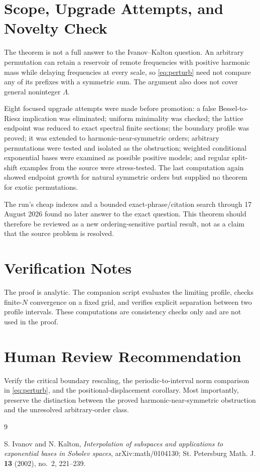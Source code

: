 \documentclass[11pt]{article}
\begin{document}
\section*{Scope, Upgrade Attempts, and Novelty Check}

The theorem is not a full answer to the Ivanov--Kalton question.  An arbitrary
permutation can retain a reservoir of remote frequencies with positive
harmonic mass while delaying frequencies at every scale, so
\eqref{eq:perturb} need not compare any of its prefixes with a symmetric sum.
The argument also does not cover general noninteger $\Lambda$.

Eight focused upgrade attempts were made before promotion: a false
Bessel-to-Riesz implication was eliminated; uniform minimality was checked;
the lattice endpoint was reduced to exact spectral finite sections; the
boundary profile was proved; it was extended to harmonic-near-symmetric
orders; arbitrary permutations were tested and isolated as the obstruction;
weighted conditional exponential bases were examined as possible positive
models; and regular split-shift examples from the source were stress-tested.
The last computation again showed endpoint growth for natural symmetric
orders but supplied no theorem for exotic permutations.

The run's cheap indexes and a bounded exact-phrase/citation search through
17 August 2026 found no later answer to the exact question.  This theorem
should therefore be reviewed as a new ordering-sensitive partial result, not
as a claim that the source problem is resolved.

\section*{Verification Notes}

The proof is analytic.  The companion script evaluates the limiting profile,
checks finite-$N$ convergence on a fixed grid, and verifies explicit
separation between two profile intervals.  These computations are consistency
checks only and are not used in the proof.

\section*{Human Review Recommendation}

Verify the critical boundary rescaling, the periodic-to-interval norm
comparison in \eqref{eq:perturb}, and the positional-displacement corollary.
Most importantly, preserve the distinction between the proved
harmonic-near-symmetric obstruction and the unresolved arbitrary-order class.

\enlargethispage{2\baselineskip}
\begin{thebibliography}{9}
\small

S. Ivanov and N. Kalton,
\emph{Interpolation of subspaces and applications to exponential bases in
Sobolev spaces},
arXiv:math/0104130; St. Petersburg Math. J. \textbf{13} (2002), no.~2,
221--239.

\end{thebibliography}
\end{document}
